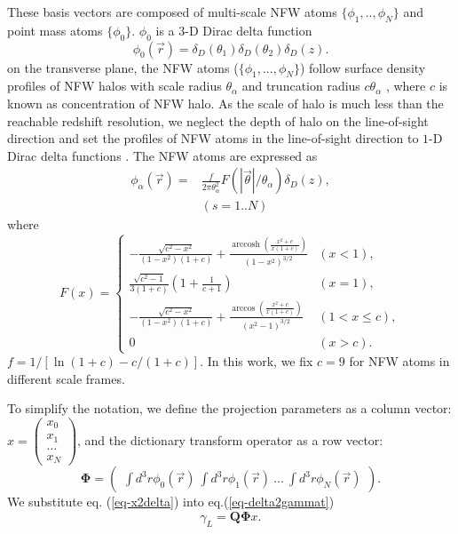\documentclass[twocolumn]{aastex62}
\DeclareMathOperator{\arccosh}{arccosh}
\begin{document}
These basis vectors are composed of multi-scale NFW atoms $\{\phi_1,..,\phi_{N}\}$ and point
mass atoms $\{\phi_0\}$. $\phi_0$ is a $3$-D Dirac delta function
\begin{equation}
\phi_0(\vec{r})= \delta_D(\theta_1) \delta_D(\theta_2) \delta_D(z).
\end{equation}
on the transverse plane, the NFW atoms ($\{\phi_1,...,\phi_N\}$) follow surface density profiles of NFW halos
\citep{haloModel-TJ2003-3pt} with scale radius $\theta_\alpha$ and truncation radius $c \theta_\alpha$ ,
where $c$ is known as concentration of NFW halo.
As the scale of halo is much less than the reachable redshift resolution, we neglect the depth of halo on the
line-of-sight direction and set the profiles of NFW atoms in the line-of-sight direction to $1$-D Dirac delta functions
\citep{LSS-massMap-Glimpse3D-Leonard2014}. The NFW atoms are expressed as
\begin{equation}
\begin{split}
\phi_\alpha(\vec{r}) =&\frac{f }{2 \pi \theta_\alpha^2 } F(|\vec{\theta}|/\theta_\alpha) \delta_D(z),\\
&  (s=1..N)
\end{split}
\end{equation}
where
\begin{equation}
F(x)=
\begin{cases}
-\frac{\sqrt{c^2-x^2}}{(1-x^2)(1+c)} + \frac{\arccosh \left(\frac{x^2+c}{x(1+c)}\right)}{(1-x^2)^{3/2}}  & (x<1),\\
\frac{\sqrt{c^2-1}}{3(1+c)} (1+\frac{1}{c+1}) & (x=1),\\
-\frac{\sqrt{c^2-x^2}}{(1-x^2)(1+c)} + \frac{\arccos\left(\frac{x^2+c}{x(1+c)}\right)}{(x^2-1)^{3/2}} & (1<x\leq c),\\
0& (x>c).
\end{cases}
\end{equation}
$f=1/[\ln (1+c)-c/(1+c)]$. In this work, we fix $c=9$ for NFW atoms in different scale frames.

To simplify the notation, we define the projection parameters as a column vector:
$x=\begin{pmatrix}
x_{0}\\
x_{1}\\
...\\
x_{N}
\end{pmatrix}$,
and the dictionary transform operator as a row vector:
\begin{equation}
\mathbf{\Phi}=\begin{pmatrix}
\int d^3r\phi_0(\vec{r}) ~\int d^3r \phi_1(\vec{r})~ ...~\int d^3r \phi_{N}(\vec{r})
\end{pmatrix}.
\end{equation}
We substitute eq. (\ref{eq-x2delta}) into eq.(\ref{eq-delta2gammat})
\begin{equation}\label{eq-x2gammat}
\gamma_L=\mathbf{Q}\mathbf{\Phi} x.
\end{equation}
\end{document}
